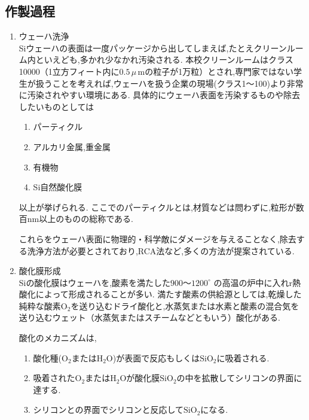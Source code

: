 \documentclass[11pt]{jarticle}
\begin{document}
	\subsection{作製過程}
		\begin{enumerate}
			\item ウェーハ洗浄\\
				Siウェーハの表面は一度パッケージから出してしまえば,たとえクリーンルーム内といえども,多かれ少なかれ汚染される.
				本校クリーンルームはクラス10000（1立方フィート内に$0.5\,\mu$\,mの粒子が1万粒）とされ,専門家ではない学生が扱うことを考えれば,ウェーハを扱う企業の現場(クラス1〜100)より非常に汚染されやすい環境にある.
				具体的にウェーハ表面を汚染するものや除去したいものとしては

				\begin{enumerate}
					\item パーティクル\\
					\item アルカリ金属,重金属\\
					\item 有機物\\
					\item Si自然酸化膜\\
				\end{enumerate}

				以上が挙げられる.
				ここでのパーティクルとは,材質などは問わずに,粒形が数百nm以上のものの総称である.

				これらをウェーハ表面に物理的・科学敵にダメージを与えることなく,除去する洗浄方法が必要とされており,RCA法など,多くの方法が提案されている.

			\item 酸化膜形成\\
				Siの酸化膜はウェーハを,酸素を満たした$900〜1200^\circ$ の高温の炉中に入れr熱酸化によって形成されることが多い.
				満たす酸素の供給源としては,乾燥した純粋な酸素$\mathrm{O_{2}}$を送り込むドライ酸化と,水蒸気または水素と酸素の混合気を送り込むウェット（水蒸気またはスチームなどともいう）酸化がある.

				酸化のメカニズムは,

				\begin{enumerate}
					\item 酸化種($\mathrm{O_{2}}$または$\mathrm{H_{2}O}$)が表面で反応もしくは$\mathrm{SiO_{2}}$に吸着される.\\
					\item 吸着された$\mathrm{O}_{2}$または$\mathrm{H_{2}O}$が酸化膜$\mathrm{SiO_{2}}$の中を拡散してシリコンの界面に達する.\\
					\item シリコンとの界面でシリコンと反応して$\mathrm{SiO_{2}}$になる.\\
				\end{enumerate}
				

\end{enumerate}
\end{document}
